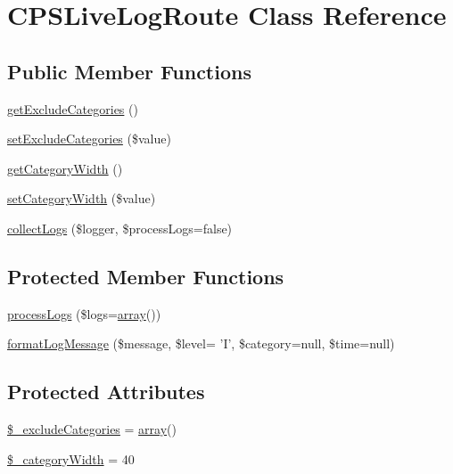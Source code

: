 \hypertarget{classCPSLiveLogRoute}{
\section{CPSLiveLogRoute Class Reference}
\label{classCPSLiveLogRoute}
}
\subsection*{Public Member Functions}
\begin{DoxyCompactItemize}
\item 
\hyperlink{classCPSLiveLogRoute_acc9683d3eaa74394ee82159398196ab8}{getExcludeCategories} ()
\item 
\hyperlink{classCPSLiveLogRoute_ad1fe56b8c471fa8818f46c39318f6373}{setExcludeCategories} (\$value)
\item 
\hyperlink{classCPSLiveLogRoute_af3edf920c9186a7479f274daaefb580b}{getCategoryWidth} ()
\item 
\hyperlink{classCPSLiveLogRoute_aca83de68fd6f754d3b9dcf265ff0be56}{setCategoryWidth} (\$value)
\item 
\hyperlink{classCPSLiveLogRoute_a6228d7e188b6c803663f67d4ea30aeda}{collectLogs} (\$logger, \$processLogs=false)
\end{DoxyCompactItemize}
\subsection*{Protected Member Functions}
\begin{DoxyCompactItemize}
\item 
\hyperlink{classCPSLiveLogRoute_a4ac809157dfd774390d8ea4b81223872}{processLogs} (\$logs=\hyperlink{list_8php_aa3205d038c7f8feb5c9f01ac4dfadc88}{array}())
\item 
\hyperlink{classCPSLiveLogRoute_ac9dde335d8302c5533f76115925722f9}{formatLogMessage} (\$message, \$level= 'I', \$category=null, \$time=null)
\end{DoxyCompactItemize}
\subsection*{Protected Attributes}
\begin{DoxyCompactItemize}
\item 
\hyperlink{classCPSLiveLogRoute_a9c4b2e98f2d0c9401bc839d5104985ce}{\$\_\-excludeCategories} = \hyperlink{list_8php_aa3205d038c7f8feb5c9f01ac4dfadc88}{array}()
\item 
\hyperlink{classCPSLiveLogRoute_a25c9edaf8b1a5b6a83f88f220356ad62}{\$\_\-categoryWidth} = 40
\end{DoxyCompactItemize}


